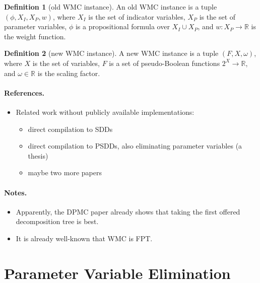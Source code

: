 \documentclass{article}
\theoremstyle{definition}
\newtheorem{definition}{Definition}
\theoremstyle{remark}
\begin{document}
\begin{definition}[old WMC instance]
  An old WMC instance is a tuple $(\phi, X_I, X_P, w)$, where $X_I$ is the set
  of indicator variables, $X_P$ is the set of parameter variables, $\phi$ is a
  propositional formula over $X_I \cup X_P$, and $w\colon X_P \to \mathbb{R}$ is
  the weight function.
\end{definition}

\begin{definition}[new WMC instance]
  A new WMC instance is a tuple $(F, X, \omega)$, where $X$ is the set of
  variables, $F$ is a set of pseudo-Boolean functions $2^X \to \mathbb{R}$, and
  $\omega \in \mathbb{R}$ is the scaling factor.
\end{definition}

\paragraph{References.}
\begin{itemize}
\item Related work without publicly available implementations:
  \begin{itemize}
  \item direct compilation to SDDs \cite{DBLP:conf/ecsqaru/ChoiKD13}
  \item direct compilation to PSDDs, also eliminating parameter variables (a thesis)
  \item maybe two more papers
  \end{itemize}
\end{itemize}

\paragraph{Notes.}
\begin{itemize}
\item Apparently, the \textsc{DPMC} paper already shows that taking the first
  offered decomposition tree is best.
\item It is already well-known that WMC is FPT.
\end{itemize}

\section{Parameter Variable Elimination}
\end{document}
